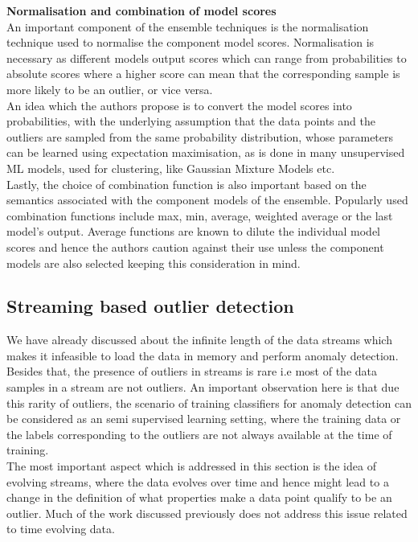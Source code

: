 \noindent \textbf{Normalisation and combination of model scores} \\

An important component of the ensemble techniques is the normalisation technique used to normalise the component model scores. Normalisation is necessary as different models output scores which can range from probabilities to absolute scores where a higher score can mean that the corresponding sample is more likely to be an outlier, or vice versa. \\ 

An idea which the authors propose is to convert the model scores into probabilities, with the underlying assumption that the data points and the outliers are sampled from the same probability distribution, whose parameters can be learned using expectation maximisation, as is done in many unsupervised ML models, used for clustering, like Gaussian Mixture Models etc. \\

Lastly, the choice of combination function is also important based on the semantics associated with the component models of the ensemble. Popularly used combination functions include max, min, average, weighted average or the last model's output. Average functions are known to dilute the individual model scores and hence the authors caution against their use unless the component models are also selected keeping this consideration in mind. 

\subsection{Streaming based outlier detection}

We have already discussed about the infinite length of the data streams which makes it infeasible to load the data in memory and perform anomaly detection. Besides that, the presence of outliers in streams is rare i.e most of the data samples in a stream are not outliers. An important observation here is that due this rarity of outliers, the scenario of training classifiers for anomaly detection can be considered as an semi supervised learning setting, where the training data or the labels corresponding to the outliers are not always available at the time of training. \\

The most important aspect which is addressed in this section is the idea of evolving streams, where the data evolves over time and hence might lead to a change in the definition of what properties make a data point qualify to be an outlier. Much of the work discussed previously does not address this issue related to time evolving data. \\

